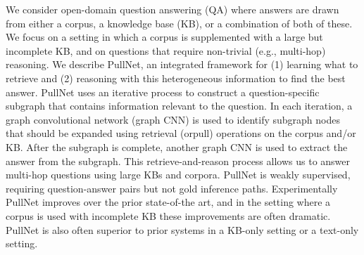 We consider open-domain question answering (QA) where answers are drawn from either a corpus, a knowledge base (KB), or a combination of both of these. We focus on a setting in which a corpus is supplemented with a large but incomplete KB, and on questions that require non-trivial (e.g., multi-hop) reasoning. We describe PullNet, an integrated framework for (1) learning what to retrieve and (2) reasoning with this heterogeneous information to find the best answer. PullNet uses an iterative process to construct a question-specific subgraph that contains information relevant to the question. In each iteration, a graph convolutional network (graph CNN) is used to identify subgraph nodes that should be expanded using retrieval (orpull) operations on the corpus and/or KB. After the subgraph is complete, another graph CNN is used to extract the answer from the subgraph. This retrieve-and-reason process allows us to answer multi-hop questions using large KBs and corpora. PullNet is weakly supervised, requiring question-answer pairs but not gold inference paths. Experimentally PullNet improves over the prior state-of-the art, and in the setting where a corpus is used with incomplete KB these improvements are often dramatic. PullNet is also often superior to prior systems in a KB-only setting or a text-only setting.

